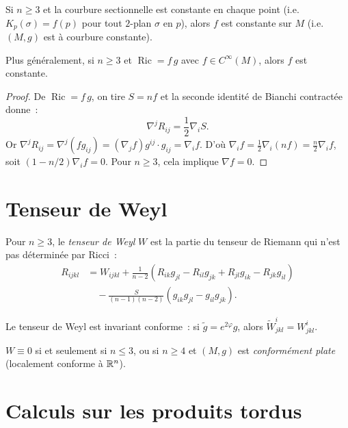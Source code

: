 \begin{theoreme}[Schur]
Si $n \geq 3$ et la courbure sectionnelle est constante en chaque point
(i.e.\ $K_p(\sigma) = f(p)$ pour tout $2$-plan $\sigma$ en $p$), alors $f$ est
constante sur $M$ (i.e.\ $(M,g)$ est \`a courbure constante).

Plus g\'en\'eralement, si $n \geq 3$ et $\operatorname{Ric} = f\, g$ avec
$f \in C^\infty(M)$, alors $f$ est constante.
\end{theoreme}

\begin{proof}
De $\operatorname{Ric} = f\, g$, on tire $S = nf$ et la seconde identit\'e de
Bianchi contract\'ee donne~:
\[
    \nabla^j R_{ij} = \frac{1}{2}\nabla_i S.
\]
Or $\nabla^j R_{ij} = \nabla^j(fg_{ij}) = (\nabla_j f) g^{ij}\cdot g_{ij} = \nabla_i f$.
D'o\`u $\nabla_i f = \frac{1}{2}\nabla_i(nf) = \frac{n}{2}\nabla_i f$, soit
$(1 - n/2)\nabla_i f = 0$. Pour $n \geq 3$, cela implique $\nabla f = 0$.
\end{proof}

\section{Tenseur de Weyl}

\begin{definition}
Pour $n \geq 3$, le \emph{tenseur de Weyl} $W$ est la partie du tenseur de Riemann
qui n'est pas d\'etermin\'ee par Ricci~:
\begin{align*}
    R_{ijkl} &= W_{ijkl} + \frac{1}{n-2}\left(R_{ik}g_{jl} - R_{il}g_{jk}
    + R_{jl}g_{ik} - R_{jk}g_{il}\right) \\
    &\quad - \frac{S}{(n-1)(n-2)}\left(g_{ik}g_{jl} - g_{il}g_{jk}\right).
\end{align*}
\end{definition}

\begin{proposition}
Le tenseur de Weyl est invariant conforme~: si $\tilde{g} = e^{2\varphi}g$, alors
$\tilde{W}^i_{jkl} = W^i_{jkl}$.
\end{proposition}

\begin{proposition}
$W \equiv 0$ si et seulement si $n \leq 3$, ou si $n \geq 4$ et $(M,g)$ est
\emph{conform\'ement plate} (localement conforme \`a $\mathbb{R}^n$).
\end{proposition}

\section{Calculs sur les produits tordus}

